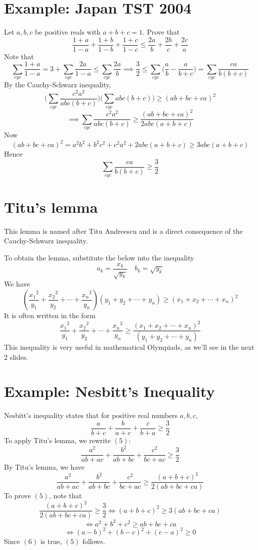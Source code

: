 \documentclass[12pt]{article}
\begin{document}
\section{Example: Japan TST 2004}
Let $a,b,c$ be positive reals with $a+b+c=1$. Prove that $$\frac{1+a}{1-a}+\frac{1+b}{1-b}+\frac{1+c}{1-c}\leq \frac{2a}{b}+\frac{2b}{c}+\frac{2c}{a}$$
Note that
$$\sum\limits_{cyc}\frac{1+a}{1-a}=3+\sum\limits_{cyc}\frac{2a}{1-a}\leq  \sum\limits_{cyc}\frac{2a}{b}\implies \frac{3}{2}\leq\sum\limits_{cyc}\bigg(\frac{a}{b}-\frac{a}{b+c}\bigg)=\sum\limits_{cyc}\frac{ca}{b(b+c)}$$
By the Cauchy-Schwarz inequality,
$$\bigg(\sum\limits_{cyc}\frac{c^2a^2}{abc(b+c)}\bigg)\bigg(\sum\limits_{cyc} abc(b+c) \bigg) \geq (ab+bc+ca)^2$$ $$\implies \sum\limits_{cyc}\frac{c^2a^2}{abc(b+c)} \geq \frac{(ab+bc+ca)^2}{2abc (a+b+c)}$$Now$$(ab+bc+ca)^2=a^2b^2+b^2c^2+c^2a^2+2abc(a+b+c)\geq 3abc(a+b+c)$$
Hence
$$\sum\limits_{cyc}\frac{ca}{b(b+c)}\geq \frac{3}{2}$$
\newpage 
\section{Titu's lemma}
This lemma is named after Titu Andreescu and is a direct consequence of the Cauchy-Schwarz inequality.

\medskip
\noindent
To obtain the lemma, substitute the below into the inequality
$$a_{k}=\frac{x_{k}}{\sqrt{y_{k}}} \quad b_{k}=\sqrt{y_{k}}$$ 
We have
$$\left(\frac{{x_{1}}^{2}}{y_{1}}+\frac{{x_{2}}^{2}}{y_{2}}+\cdots+\frac{{x_{n}}^{2}}{y_{n}}\right)\left(y_{1}+y_{2}+\cdots+y_{n}\right) \geq\left(x_{1}+x_{2}+\cdots+x_{n}\right)^{2}$$
It is often written in the form
$$\frac{{x_{1}}^{2}}{y_{1}}+\frac{{x_{2}}^{2}}{y_{2}}+\cdots+\frac{{x_{n}}^{2}}{y_{n}} \geq \frac{\left(x_{1}+x_{2}+\cdots+x_{n}\right)^{2}}{\left(y_{1}+y_{2}+\cdots+y_{n}\right)}$$
This inequality is very useful in mathematical Olympiads, as we'll see in the next 2 slides.

\newpage
\section{Example: Nesbitt's Inequality}
Nesbitt's inequality states that for positive real numbers $a,b,c,$
\begin{equation}
\frac{a}{b+c}+\frac{b}{a+c}+\frac{c}{b+a} \geq \frac{3}{2}
\end{equation}
To apply Titu's lemma, we rewrite $(5)$:
$$\frac{a^{2}}{a b+a c}+\frac{b^{2}}{a b+b c}+\frac{c^{2}}{b c+a c}\geq \frac{3}{2}$$
By Titu's lemma, we have
$$\frac{a^{2}}{a b+a c}+\frac{b^{2}}{a b+b c}+\frac{c^{2}}{b c+a c} \geq \frac{(a+b+c)^{2}}{2(a b+b c+c a)}$$
To prove $(5)$, note that
$$\frac{(a+b+c)^{2}}{2(a b+b c+c a)}\geq\frac{3}{2} \Longleftrightarrow (a+b+c)^{2} \geq 3(a b+b c+c a)$$
$$\Longleftrightarrow a^{2}+b^{2}+c^{2} \geq a b+b c+c a $$
\begin{equation} 
\Longleftrightarrow (a-b)^{2}+(b-c)^{2}+(c-a)^{2} \geq 0
\end{equation}
Since $(6)$ is true, $(5)$ follows.
\end{document}

